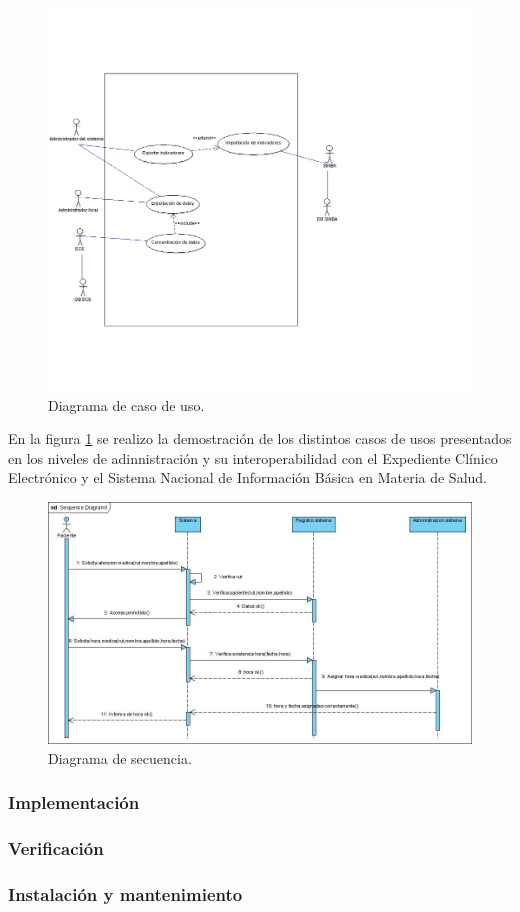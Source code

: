           \begin{figure}[h]
            \centering
            \includegraphics[scale=.3]{lib/assets/casodeuso}
            \caption{Diagrama de caso de uso.}
            \label{casouso}
          \end{figure}
          En la figura \ref{casouso} se realizo la demostración de los distintos casos de usos presentados en los niveles de adinnistración y su interoperabilidad con el Expediente Clínico Electrónico y el Sistema Nacional de Información Básica en Materia de Salud.

            \begin{figure}[h]
             \centering
              \includegraphics[scale=.5]{lib/assets/secuencia}
              \caption{Diagrama de secuencia.}
              \label{metodologia}
            \end{figure}
          \subsubsection{Implementación}
          \subsubsection{Verificación}
          \subsubsection{Instalación y mantenimiento}

